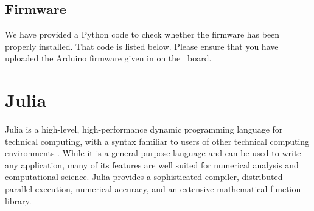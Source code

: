 



\subsection{Firmware}
\lstset{style=mystyle}
\label{sec:test-firmware-python}
We have provided a Python code to check whether the firmware has been
properly installed. That code is listed below. 
Please ensure that you have uploaded the Arduino firmware given in  on the \arduino\ board.


\begin{pycode}
      \label{py:test-firmware}
      
\end{pycode}





\section{Julia}
\label{sec:julia-start}
Julia is a high-level, high-performance dynamic programming language for 
technical computing, with a syntax familiar to users of other technical computing 
environments \cite{julia-ref}. While it is a general-purpose language and can be used to write any 
application, many of its features are well suited for numerical analysis and 
computational science. Julia provides a sophisticated compiler, distributed 
parallel execution, numerical accuracy, and an extensive mathematical function
library. 

